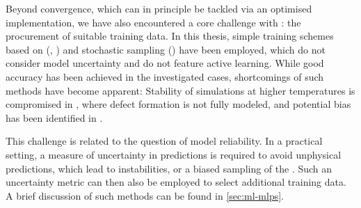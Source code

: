 Beyond convergence, which can in principle be tackled via an optimised implementation, we have also encountered a core challenge with \mlps: the procurement of suitable training data. In this thesis, simple training schemes based on \aimd (, ) and stochastic sampling () have been employed, which do not consider model uncertainty and do not feature active learning. While good accuracy has been achieved in the investigated cases, shortcomings of such methods have become apparent: Stability of \md simulations at higher temperatures is compromised in , where defect formation is not fully modeled, and potential bias has been identified in .

This challenge is related to the question of model reliability. In a practical setting, a measure of uncertainty in predictions is required to avoid unphysical predictions, which lead to instabilities, or a biased sampling of the \pes. Such an uncertainty metric can then also be employed to select additional training data. A brief discussion of such methods can be found in \cref{sec:ml-mlps}.
